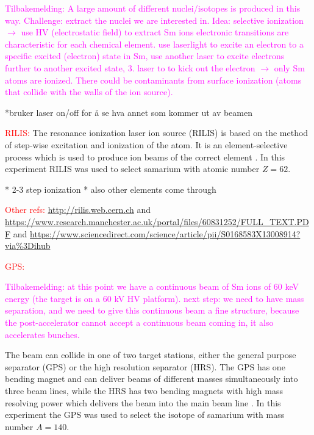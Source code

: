 \documentclass[twoside,english]{uiofysmaster/uiofysmaster}
\begin{document}
\textcolor{Magenta}{Tilbakemelding: \newline 
A large amount of different nuclei/isotopes is produced in this way. Challenge: extract the nuclei we are interested in. Idea: selective ionization $\rightarrow$ use HV (electrostatic field) to extract Sm ions electronic transitions are characteristic for each chemical element. use laserlight to excite an electron to a specific excited (electron) state in Sm, use another laser to excite electrons further to another excited state, 3. laser to to kick out the electron $\rightarrow$ only Sm atoms are ionized. There could be contaminants from surface ionization (atoms that collide with the walls of the ion source).}

*bruker laser on/off for å se hva annet som kommer ut av beamen


\textcolor{red}{RILIS:} \newline
The resonance ionization laser ion source (RILIS) is based on the method of step-wise excitation and ionization of the atom. It is an element-selective process which is used to produce ion beams of the correct element \cite{RILIS}. In this experiment RILIS was used to select samarium with atomic number $Z = 62$. 

* 2-3 step ionization
* also other elements come through

\textcolor{red}{Other refs:} \url{http://rilis.web.cern.ch} and \url{https://www.research.manchester.ac.uk/portal/files/60831252/FULL_TEXT.PDF} and \url{https://www.sciencedirect.com/science/article/pii/S0168583X13008914?via%3Dihub}

\bigskip

\textcolor{red}{GPS:} \newline

\textcolor{Magenta}{Tilbakemelding: \newline 
at this point we have a continuous beam of Sm ions of 60 keV energy (the target is on a 60 kV HV platform). \newline
next step: we need to have mass separation, and we need to give this continuous beam a fine structure, because the post-accelerator cannot accept a continuous beam coming in, it also accelerates bunches.}

The beam can collide in one of two target stations, either the general purpose separator (GPS) or the high resolution separator (HRS). The GPS has one bending magnet and can deliver beams of different masses simultaneously into three beam lines, while the HRS has two bending magnets with high mass resolving power which delivers the beam into the main beam line \cite{GPS}. In this experiment the GPS was used to select the isotope of samarium with mass number $A = 140$. 
\end{document}
